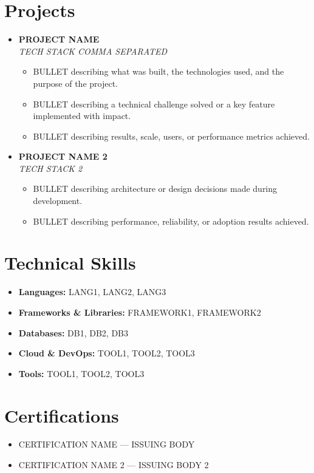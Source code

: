 \documentclass[a4paper,11pt]{article}
\begin{document}
\section{Projects}
\begin{itemize}
    \item \textbf{PROJECT NAME} \\
    \textit{TECH STACK COMMA SEPARATED}
    \begin{itemize}
        \item BULLET describing what was built, the technologies used, and the purpose of the project.
        \item BULLET describing a technical challenge solved or a key feature implemented with impact.
        \item BULLET describing results, scale, users, or performance metrics achieved.
    \end{itemize}
    \item \textbf{PROJECT NAME 2} \\
    \textit{TECH STACK 2}
    \begin{itemize}
        \item BULLET describing architecture or design decisions made during development.
        \item BULLET describing performance, reliability, or adoption results achieved.
    \end{itemize}
\end{itemize}
\section{Technical Skills}
\begin{itemize}
    \item \textbf{Languages:} LANG1, LANG2, LANG3
    \item \textbf{Frameworks \& Libraries:} FRAMEWORK1, FRAMEWORK2
    \item \textbf{Databases:} DB1, DB2, DB3
    \item \textbf{Cloud \& DevOps:} TOOL1, TOOL2, TOOL3
    \item \textbf{Tools:} TOOL1, TOOL2, TOOL3
\end{itemize}
\section{Certifications}
\begin{itemize}
    \item CERTIFICATION NAME --- ISSUING BODY
    \item CERTIFICATION NAME 2 --- ISSUING BODY 2
\end{itemize}
\end{document}
